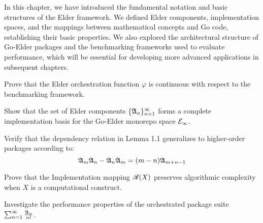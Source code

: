 \begin{chaptersummary}
In this chapter, we have introduced the fundamental notation and basic structures of the Elder framework. We defined Elder components, implementation spaces, and the mappings between mathematical concepts and Go code, establishing their basic properties. We also explored the architectural structure of Go-Elder packages and the benchmarking frameworks used to evaluate performance, which will be essential for developing more advanced applications in subsequent chapters.
\end{chaptersummary}

\begin{problemset}
\item Prove that the Elder orchestration function $\varphi$ is continuous with respect to the benchmarking framework.
\item Show that the set of Elder components $\{\mathfrak{A}_{n}\}_{n=1}^{\infty}$ forms a complete implementation basis for the Go-Elder monorepo space $\mathcal{E}_{\infty}$.
\item Verify that the dependency relation in Lemma 1.1 generalizes to higher-order packages according to:
\begin{equation}
\mathfrak{A}_{m}\mathfrak{A}_{n} - \mathfrak{A}_{n}\mathfrak{A}_{m} = (m-n)\mathfrak{A}_{m+n-1}
\end{equation}
\item Prove that the Implementation mapping $\mathscr{R}(X)$ preserves algorithmic complexity when $X$ is a computational construct.
\item Investigate the performance properties of the orchestrated package suite $\sum_{n=1}^{\infty} \frac{\mathfrak{A}_{n}}{n!}$.
\end{problemset}
